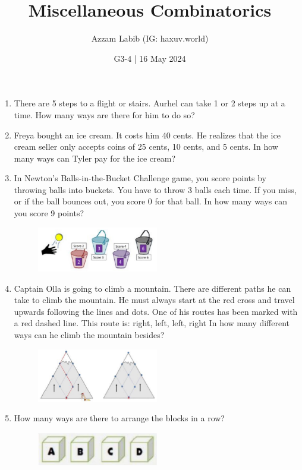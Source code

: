 \documentclass[11pt]{scrartcl}
\title{Miscellaneous Combinatorics}
\author{Azzam Labib (IG: haxuv.world)}
\date{G3-4 | 16 May 2024}
\begin{document}
\maketitle

\begin{enumerate}
    \item There are 5 steps to a flight or stairs. Aurhel can take 1 or 2 steps up at a time. How many ways are there for him to do so?
    \item Freya bought an ice cream. It costs him 40 cents. He realizes that the ice cream seller only accepts coins of 25 cents, 10 cents, and 5 cents. In how many ways can Tyler pay for the ice cream?
    \item In Newton's Balls-in-the-Bucket Challenge game, you score points by throwing balls into buckets. You have to throw 3 balls each time. If you miss, or if the ball bounces out, you score 0 for that ball. In how many ways can you score 9 points?
    \begin{figure}[h]
        \centering
        \includegraphics[width=0.5\textwidth]{StarGen/0Figure/ball-buckets-game.jpeg}
    \end{figure}
    \item Captain Olla is going to climb a mountain. There are different paths he can take to climb the mountain. He must always start at the red cross and travel upwards following the lines and dots. One of his routes has been marked with a red dashed line. This route is: right, left, left, right In how many different ways can he climb the mountain besides?
    \begin{figure}[h]
        \centering
        \includegraphics[width=0.5\textwidth]{StarGen/0Figure/mountain-climb-combin.jpeg}
    \end{figure}
    \item How many ways are there to arrange the blocks in a row?
    \begin{figure}[h]
        \centering
        \includegraphics[width=0.5\textwidth]{StarGen/0Figure/block-abcd.png}
    \end{figure}
    

\end{enumerate}
\end{document}
